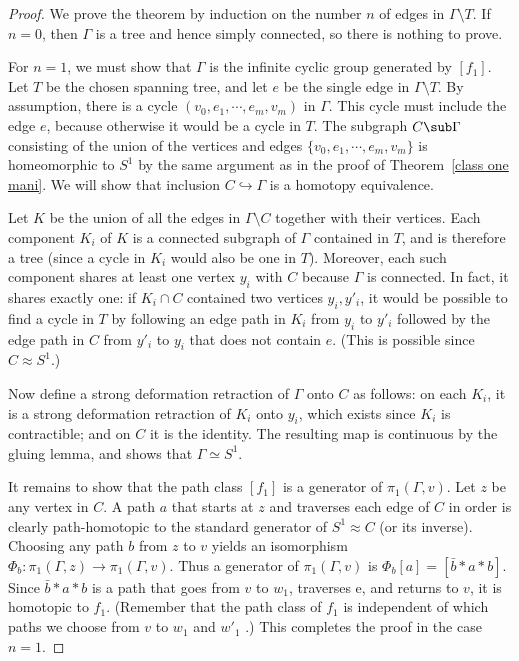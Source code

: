 \begin{proof}
We prove the theorem by induction on the number $n$ of edges in $\Gamma\setminus T$. If $n=0$, then $\Gamma$ is a tree and hence simply connected, so there is nothing 
to prove.\par
For $n=1$, we must show that $\Gamma$ is the infinite cyclic group generated by $[f_1]$. Let $T$ be the chosen spanning tree, and let $e$ be the single edge in 
$\Gamma\setminus T$. By assumption, there is a cycle $(v_0,e_1,\cdots,e_m,v_m)$ in $\Gamma$. This cycle must include the edge $e$, because otherwise it would be a 
cycle in $T$. The subgraph $C\sub\Gamma$ consisting of the union of the vertices and edges $\{v_0,e_1,\cdots,e_m,v_m\}$ is homeomorphic to $S^1$ by the same argument 
as in the proof of Theorem~\ref{class one mani}. We will show that inclusion $C\hookrightarrow\Gamma$ is a homotopy equivalence.\par
Let $K$ be the union of all the edges in $\Gamma\setminus C$ together with their vertices. Each component $K_i$ of $K$ is a connected subgraph of $\Gamma$ contained in $T$, and is therefore a tree (since a cycle in $K_i$ would also be one in $T$). Moreover, each such component shares at least one vertex $y_i$ with $C$ because $\Gamma$ is connected. In fact, it shares exactly one: if $K_i\cap C$ contained two vertices $y_i,y'_i$, it would be possible to find a cycle in $T$ by following an edge path in $K_i$ from $y_i$ to $y'_i$ followed by the edge path in $C$ from $y'_i$ to $y_i$ that does not contain $e$. (This is possible since $C\approx S^1$.)\par
Now define a strong deformation retraction of $\Gamma$ onto $C$ as follows: on each $K_i$, it is a strong deformation retraction of $K_i$ onto $y_i$, which exists since $K_i$ is contractible; and on $C$ it is the identity. The resulting map is continuous by the gluing lemma, and shows that $\Gamma\simeq S^1$.\par
It remains to show that the path class $[f_1]$ is a generator of $\pi_1(\Gamma,v)$. Let $z$ be any vertex in $C$. A path $a$ that starts at $z$ and traverses each edge of $C$ in order is clearly path-homotopic to the standard generator of $S^1\approx C$ (or its inverse). Choosing any path $b$ from $z$ to $v$ yields an isomorphism $\varPhi_b:\pi_1(\Gamma,z)\to\pi_1(\Gamma,v)$. Thus a generator of $\pi_1(\Gamma,v)$ is $\varPhi_b[a]=[\bar{b}\ast a\ast b]$. Since $\bar{b}\ast a\ast b$ is a path that
goes from $v$ to $w_1$, traverses e, and returns to $v$, it is homotopic to $f_1$. (Remember that the path class of $f_1$ is independent of which paths we choose from $v$ to $w_1$ and $w'_1$ .) This completes the proof in the case $n=1$.\par

\end{proof}
